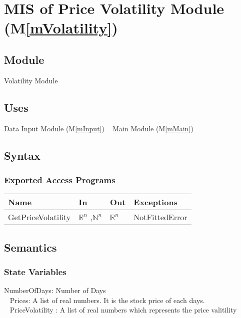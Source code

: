 \documentclass[12pt, titlepage]{article}
\newcommand{\mref}[1]{M\ref{#1}}
\begin{document}
\section{MIS of Price Volatility Module (\mref{mVolatility}) } 

\subsection{Module}
Volatility Module
\subsection{Uses}
Data Input Module (\mref{mInput})
~\newline
Main Module (\mref{mMain})
\subsection{Syntax}

\subsubsection{Exported Access Programs}

\begin{center}
\begin{tabular}{p{4cm} p{2cm} p{2cm} p{4cm}}
\hline
\textbf{Name} & \textbf{In} & \textbf{Out} & \textbf{Exceptions} \\
\hline

GetPriceVolatility & $\mathbb{R}^n$ ,$\mathbb{N}^n$ & $\mathbb{R}^n$ & NotFittedError \\
\hline
\end{tabular}
\end{center}

\subsection{Semantics}
\subsubsection{State Variables}
NumberOfDays: Number of Days\\ 
~\newline
Prices: A list of real numbers. It is the stock price of each days.\\
~\newline
PriceVolatility : A list of real numbers which represents the price valitility\\
\end{document}
